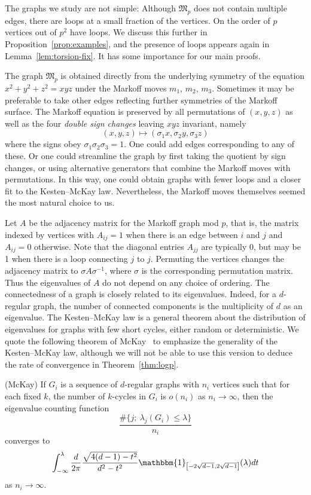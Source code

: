 \documentclass[AHL, Unicode, longabstracts, published]{cedram}
\begin{document}
The graphs we study are not simple: Although $\mathfrak{M}_p$ does not contain multiple edges, there are loops at a small fraction of the vertices. On the order of $p$ vertices out of $p^2$ have loops. We discuss this further in Proposition~\ref{prop:examples}, and the presence of loops appears again in Lemma~\ref{lem:torsion-fix}. It has some importance for our main proofs.

The graph $\mathfrak{M}_p$ is obtained directly from the underlying symmetry of the equation $x^2+y^2 +z^2 =xyz$ under the Markoff moves $m_1$, $m_2$, $m_3$. Sometimes it may be preferable to take other edges reflecting further symmetries of the Markoff surface. The Markoff equation is preserved by all permutations of $(x,y,z)$ as well as the four \emph{double sign changes} leaving $xyz$ invariant, namely
\begin{equation}\label{eqn:signs}
(x,y,z) \mapsto (\sigma_1 x, \sigma_2 y, \sigma_3 z)
\end{equation}
where the signs obey $\sigma_1 \sigma_2 \sigma_3 = 1$. One could add edges corresponding to any of these. Or one could streamline the graph by first taking the quotient by sign changes, or using alternative generators that combine the Markoff moves with permutations. In this way, one could obtain graphs with fewer loops and a closer fit to the Kesten--McKay law. Nevertheless, the Markoff moves themselves seemed the most natural choice to us.

Let $A$ be the adjacency matrix for the Markoff graph mod $p$, that is, the matrix indexed by vertices with $A_{ij} = 1$ when there is an edge between $i$ and $j$ and $A_{ij}=0$ otherwise. Note that the diagonal entries $A_{jj}$ are typically 0, but may be 1 when there is a loop connecting $j$ to $j$. Permuting the vertices changes the adjacency matrix to $\sigma A\sigma^{-1}$, where $\sigma$ is the corresponding permutation matrix. Thus the eigenvalues of $A$ do not depend on any choice of ordering. The connectedness of a graph is closely related to its eigenvalues. Indeed, for a $d$-regular graph, the number of connected components is the multiplicity of $d$ as an eigenvalue. The Kesten--McKay law is a general theorem about the distribution of eigenvalues for graphs with few short cycles, either random or deterministic. We quote the following theorem of McKay~\cite[Theorem~1.1]{M} to emphasize the generality of the Kesten--McKay law, although we will not be able to use this version to deduce the rate of convergence in Theorem~\ref{thm:logp}.

\begin{theo}(McKay)
If $G_i$ is a sequence of $d$-regular graphs with $n_i$ vertices such that for each fixed $k$, the number of $k$-cycles in $G_i$ is $o(n_i)$ as $n_i \rightarrow \infty$, then the eigenvalue counting function
\[
\frac{ \# \{ j ; \ \lambda_j(G_i) \leq \lambda \}}{n_i}
\]
converges to
\begin{equation*}\label{thm:mckay}
\int_{-\infty}^{\lambda} \frac{d}{2\pi} \frac{ \sqrt{4(d-1) - t^2} }{d^2 - t^2} \mathbbm{1}_{\left[-2\sqrt{d-1},2\sqrt{d-1}\right]}(\lambda) dt
\end{equation*}
as $n_i \rightarrow \infty$.
\end{theo}
\end{document}
